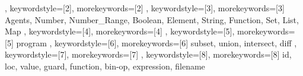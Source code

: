 {{	 }, 
	 keywordstyle=[2]{\asmlstrule}, %
	 morekeywords=[2]{
	 }, 
	 keywordstyle=[3]{\asmlstdomain}, %
	 morekeywords=[3]{
	 	Agents, Number, Number_Range, Boolean, Element, String, Function, Set, List, Map
	 },
	 keywordstyle=[4]{\asmlstpredicate},%
	 morekeywords=[4]{
	 },
	 keywordstyle=[5]{\asmlstfunction}, %
	 morekeywords=[5]{
		program
	 },
	 keywordstyle=[6]{\asmlstderived}, %
	 morekeywords=[6]{
	 subset, union, intersect, diff
	 },
	 keywordstyle=[7]{\asmlstvariable}, %
	 morekeywords=[7]{
	 },
	 keywordstyle=[8]{\asmlstconstant}, %
	 morekeywords=[8]{
	 id, loc, value, guard, function, bin-op, expression, filename
	 }
}
\newcommand{\AsmKeyword}[1]{\lstset{morekeywords=[1]{#1}}}
\newcommand{\AsmRule}[1]{\lstset{morekeywords=[2]{#1}}}
\newcommand{\AsmDomain}[1]{\lstset{morekeywords=[3]{#1}}}
\newcommand{\AsmPredicate}[1]{\lstset{morekeywords=[4]{#1}}}
\newcommand{\AsmFunction}[1]{\lstset{morekeywords=[5]{#1}}}
\newcommand{\AsmDerivedFunction}[1]{\lstset{morekeywords=[6]{#1}}}
\newcommand{\AsmVariable}[1]{\lstset{morekeywords=[7]{#1}}}
\newcommand{\AsmConstantOrEnum}[1]{\lstset{morekeywords=[8]{#1}}}

\newcommand{\asmboxed}[1]{\fontsize{7}{8.4}\ensuremath{\boxed{\hspace{-.175em}#1\hspace{-.175em}}}}
